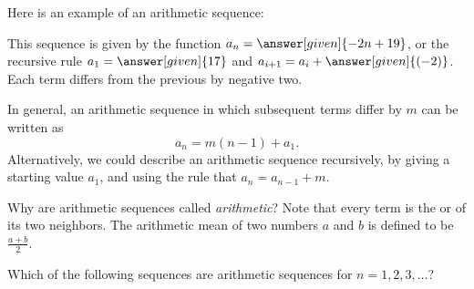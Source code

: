 \documentclass{ximera}
\begin{document}
\begin{example}
  Here is an example of an arithmetic sequence:
  \begin{image}
  \end{image}
  This sequence is given by the function $a_n=\answer[given]{-2n + 19}$, or
  the recursive rule $a_1 = \answer[given]{17}$ and $a_{i+1} = a_i +
  \answer[given]{(-2)}$. Each term differs from the previous by negative
  two.
\end{example}



In general, an arithmetic sequence in which subsequent terms differ
by $m$ can be written as
\[
a_n = m (n-1) + a_1.
\]
Alternatively, we could describe an arithmetic sequence recursively,
by giving a starting value $a_1$, and using the rule that $a_{n} =
a_{n-1} + m$.


\begin{remark}
Why are arithmetic sequences called \textit{arithmetic}?  Note that
every term is the  or  of its two
neighbors.  The arithmetic mean of two numbers $a$ and $b$ is defined
to be $\frac{a+b}{2}$.
\end{remark}



\begin{question}
  Which of the following sequences are arithmetic sequences for
  $n=1,2,3,\dots$?
  \begin{selectAll}
  \end{selectAll}
\end{question}
\end{document}
